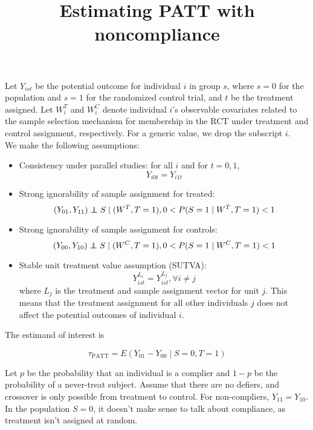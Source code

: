 \documentclass{article}
\title{Estimating PATT with noncompliance}
\newcommand{\pr}{P} %
\newcommand{\ex}{E} %
\newcommand\independent{\protect\mathpalette{\protect\independenT}{\perp}}
\def\independenT#1#2{\mathrel{\rlap{$#1#2$}\mkern2mu{#1#2}}}
\begin{document}
\maketitle


Let $Y_{ist}$ be the potential outcome for individual $i$ in group $s$, where $s=0$ for the population and $s=1$ for the randomized control trial, and $t$ be the treatment assigned.  Let $W_i^T$ and $W_i^C$ denote individual $i$'s observable covariates related to the sample selection mechanism for membership in the RCT under treatment and control assignment, respectively. For a generic value, we drop the subscript $i$.  \\


We make the following assumptions:
\begin{itemize}
\item{Consistency under parallel studies: for all $i$ and for $t=0, 1$,
\begin{equation}\label{consistency}
Y_{i0t} = Y_{i1t}
\end{equation}}
\item{Strong ignorability of sample assignment for treated:
\begin{equation}\label{si_treat}
(Y_{01}, Y_{11}) \independent S \mid (W^T, T=1), 0 < \pr(S=1 \mid W^T, T=1) <1 
\end{equation}}
\item{Strong ignorability of sample assignment for controls:
\begin{equation}\label{si_ctrl}
(Y_{00}, Y_{10}) \independent S \mid (W^C, T=1), 0 < \pr(S=1 \mid W^C, T=1) <1 
\end{equation}}
\item{Stable unit treatment value assumption (SUTVA):
\begin{equation}\label{sutva}
Y_{ist}^{L_i} = Y_{ist}^{L_j},  \forall i \neq j
\end{equation}
where $L_j$ is the treatment and sample assignment vector for unit $j$.  This means that the treatment assignment for all other individuals $j$ does not affect the potential outcomes of individual $i$.}
\end{itemize}


The estimand of interest is 

\begin{equation}
\tau_{\text{PATT}} = \ex\left( Y_{01} - Y_{00} \mid S=0, T=1\right)
\end{equation}

Let $p$ be the probability that an individual is a complier and $1-p$ be the probability of a never-treat subject.  Assume that there are no defiers, and crossover is only possible from treatment to control.  For non-compliers, $Y_{11} = Y_{10}$.  In the population $S=0$, it doesn't make sense to talk about compliance, as treatment isn't assigned at random.
\end{document}
